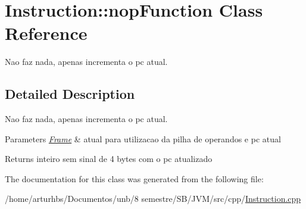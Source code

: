 \hypertarget{classInstruction_1_1nopFunction}{}\section{Instruction\+:\+:nop\+Function Class Reference}
\label{classInstruction_1_1nopFunction}


Nao faz nada, apenas incrementa o pc atual.  




\subsection{Detailed Description}
Nao faz nada, apenas incrementa o pc atual. 


\begin{DoxyParams}{Parameters}
{\em \hyperlink{classFrame}{Frame}} & atual para utilizacao da pilha de operandos e pc atual \\
\hline
\end{DoxyParams}
\begin{DoxyReturn}{Returns}
inteiro sem sinal de 4 bytes com o pc atualizado 
\end{DoxyReturn}


The documentation for this class was generated from the following file\+:\begin{DoxyCompactItemize}
\item 
/home/arturhbs/\+Documentos/unb/8 semestre/\+S\+B/\+J\+V\+M/src/cpp/\hyperlink{Instruction_8cpp}{Instruction.\+cpp}\end{DoxyCompactItemize}
